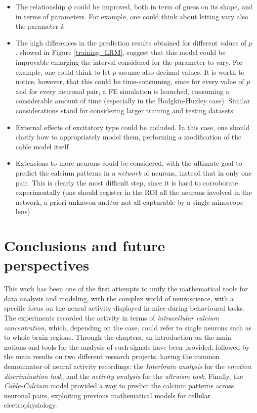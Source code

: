 \documentclass[12pt, a4paper]{report}
\begin{document}
\begin{itemize}
	\item The relationship $\phi$ could be improved, both in term of guess on its shape, and in terms of parameters. For example, one could think about letting vary also the parameter $k$
	
	\item The high differences in the prediction results obtained for different values of $p$, showed in Figure \ref{training_LRM}, suggest that this model could be improvable enlarging the interval considered for the parameter to vary. For example, one could think to let $p$ assume also decimal values. It is worth to notice, however, that this could be time-consuming, since for every value of $p$ and for every neuronal pair, a FE simulation is launched, consuming a considerable amount of time (especially in the Hodgkin-Huxley case). Similar considerations stand for considering larger training and testing datasets
	
	\item External effects of excitatory type could be included. In this case, one should clarify how to appropriately model them, performing a modification of the cable model itself
	
	\item Extensions to more neurons could be considered, with the ultimate goal to predict the calcium patterns in a \textit{network} of neurons, instead that in only one pair. This is clearly the most difficult step, since it is hard to corroborate experimentally (one should register in the ROI all the neurons involved in the network, a priori unknwon and/or not all capturable by a single minoscope lens)
	
\end{itemize}  

\chapter*{Conclusions and future perspectives}

This work has been one of the first attempts to unify the mathematical tools for data analysis and modeling, with the complex world of neuroscience, with a specific focus on the neural activity displayed in mice during behavioural tasks.\\
The experiments recorded  the activity in terms of \textit{intracellular calcium concentration}, which, depending on the case, could refer to single neurons such as to whole brain regions. Through the chapters, an introduction on the main notions and tools for the analysis of such signals have been provided, followed by the main results on two different research projects, having the common demoninator of neural activity recordings: the \textit{Interbrain analysis} for the \textit{emotion discrimination task}, and the \textit{activity analysis} for the \textit{altruism task}. Finally, the \textit{Cable-Calcium} model provided a way to predict the calcium patterns across neuronal pairs, exploiting previous mathematical models for cellular electrophysiology.\\
\end{document}
